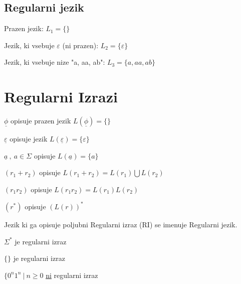 \documentclass[10pt,a4paper,oneside]{book}
\begin{document}
\subsection*{Regularni jezik}
\begin{primeri} 
\item Prazen jezik: $L_1 =\lbrace \rbrace$
\item Jezik, ki vsebuje $\varepsilon$ (ni prazen): $L_2 = \lbrace \varepsilon \rbrace$
\item Jezik, ki vsebuje nize "a, aa, ab": $L_3 = \lbrace a, aa, ab \rbrace$
\end{primeri} 

\section{Regularni Izrazi}
\begin{items}
	\item $ \underline{\phi} $ opisuje prazen jezik $ L(\underline{\phi})= \lbrace \rbrace $
	\item $ \underline{ \varepsilon } $ opisuje jezik $ L(\underline{ \varepsilon })= \lbrace \varepsilon\rbrace $
	\item $ \underline{a} \ , \ a \in \Sigma $ opisuje $ L ( \underline{a} ) = \lbrace a \rbrace $
	\item $ (r_1 + r_2) $ opisuje $ L(r_1 + r_2) = L(r_1) \bigcup L( r_2) $
	\item $ (r_1  r_2) $ opisuje $ L(r_1  r_2) = L(r_1) L( r_2) $
	\item $ (r^*) $ opisuje $ (L(r))^* $
\end{items}

Jezik ki ga opisuje poljubni Regularni izraz (RI) se imenuje Regularni jezik.
\begin{items}
	\item $\Sigma^* $ je regularni izraz
	\item $ \lbrace \rbrace $ je regularni izraz
	\item $ \lbrace 0^n 1^n \ | \ n \geqslant 0 $ \underline{ni} regularni izraz
\end{items}
	
\end{document}
